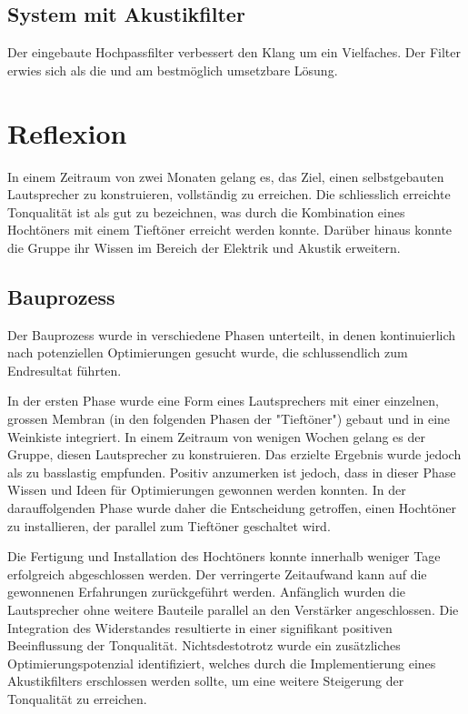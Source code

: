 \documentclass[a4paper,11pt]{report}
\begin{document}
\section{System mit Akustikfilter}
Der eingebaute Hochpassfilter verbessert den Klang um ein Vielfaches. Der Filter erwies sich als die und am bestmöglich umsetzbare Lösung.
\chapter{Reflexion}

In einem Zeitraum von zwei Monaten gelang es, das Ziel, einen selbstgebauten Lautsprecher zu konstruieren, vollständig zu erreichen. Die schliesslich erreichte Tonqualität ist als gut zu bezeichnen, was durch die Kombination eines Hochtöners mit einem Tieftöner erreicht werden konnte. Darüber hinaus konnte die Gruppe ihr Wissen im Bereich der Elektrik und Akustik erweitern. 

\section{Bauprozess}
Der Bauprozess wurde in verschiedene Phasen unterteilt, in denen kontinuierlich nach potenziellen Optimierungen gesucht wurde, die schlussendlich zum Endresultat führten.

In der ersten Phase wurde eine Form eines Lautsprechers mit einer einzelnen, grossen Membran (in den folgenden Phasen der "Tieftöner") gebaut und in eine Weinkiste integriert. In einem Zeitraum von wenigen Wochen gelang es der Gruppe, diesen Lautsprecher zu konstruieren. Das erzielte Ergebnis wurde jedoch als zu basslastig empfunden. Positiv anzumerken ist jedoch, dass in dieser Phase Wissen und Ideen für Optimierungen gewonnen werden konnten. In der darauffolgenden Phase wurde daher die Entscheidung getroffen, einen Hochtöner zu installieren, der parallel zum Tieftöner geschaltet wird. 

Die Fertigung und Installation des Hochtöners konnte innerhalb weniger Tage erfolgreich abgeschlossen werden. Der verringerte Zeitaufwand kann auf die gewonnenen Erfahrungen zurückgeführt werden. Anfänglich wurden die Lautsprecher ohne weitere Bauteile parallel an den Verstärker angeschlossen. Die Integration des Widerstandes resultierte in einer signifikant positiven Beeinflussung der Tonqualität. Nichtsdestotrotz wurde ein zusätzliches Optimierungspotenzial identifiziert, welches durch die Implementierung eines Akustikfilters erschlossen werden sollte, um eine weitere Steigerung der Tonqualität zu erreichen.
\end{document}
